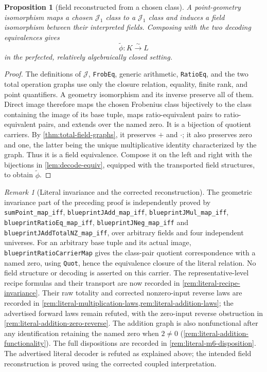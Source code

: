 \documentclass[11pt,oneside]{article}
\newtheorem{proposition}[theorem]{Proposition}
\theoremstyle{definition}
\theoremstyle{remark}
\newtheorem{remark}[theorem]{Remark}
\newcommand{\Jrel}{\mathcal{J}}
\newcommand{\lean}[1]{\nolinkurl{#1}}
\begin{document}
\begin{proposition}[field reconstructed from a chosen class]\label{prop:interpreted-reconstruction}
A point-geometry isomorphism maps a chosen $\Jrel_1$ class to a $\Jrel_1$ class and
induces a field isomorphism between their interpreted fields.  Composing with the two
decoding equivalences gives
\[
  \widetilde\phi:K\overset\sim\longrightarrow L
\]
in the perfected, relatively algebraically closed setting.
\end{proposition}
\begin{proof}
The definitions of $\Jrel$, \lean{FrobEq}, generic arithmetic, \lean{RatioEq}, and the
two total operation graphs use only the closure relation, equality, finite rank, and point
quantifiers.  A geometry isomorphism and its inverse preserve all of them.  Direct image
therefore maps the chosen Frobenius class bijectively to the class containing the image of
its base tuple, maps ratio-equivalent pairs to ratio-equivalent pairs, and extends over the
named zero.  It is a bijection of quotient carriers.  By
\cref{thm:total-field-graphs}, it preserves $+$ and $\cdot$; it also preserves zero and
one, the latter being the unique multiplicative identity characterized by the graph.
Thus it is a field equivalence.  Compose it on the left and right with the bijections in
\cref{lem:decode-equiv}, equipped with the transported field structures, to obtain
$\widetilde\phi$.
\end{proof}

\begin{remark}[Literal invariance and the corrected reconstruction]
The geometric invariance part of the preceding proof is independently proved by
\lean{sumPoint_map_iff}, \lean{blueprintJAdd_map_iff}, \lean{blueprintJMul_map_iff},
\lean{blueprintRatioEq_map_iff}, \lean{blueprintJNeg_map_iff} and
\lean{blueprintJAddTotalNZ_map_iff}, over arbitrary fields and four independent
universes. For an arbitrary base tuple and its actual image,
\lean{blueprintRatioCarrierMap} gives the class-pair quotient correspondence with
a named zero, using \lean{Quot}, hence the equivalence closure of the literal
relation. No field structure or decoding is asserted on this carrier.
The representative-level recipe formulas and their transport are now recorded in
\cref{rem:literal-recipe-invariance}. Their raw totality and corrected nonzero-input
reverse laws are recorded in \cref{rem:literal-multiplication-laws,rem:literal-addition-laws};
the advertised forward laws remain refuted, with the zero-input reverse obstruction in
\cref{rem:literal-addition-zero-reverse}. The addition graph is also nonfunctional after
any identification retaining the named zero when $2\ne0$
(\cref{rem:literal-addition-functionality}). The full dispositions are recorded in
\cref{rem:literal-m6-disposition}.
The advertised literal decoder is refuted as explained above; the intended
field reconstruction is proved using the corrected coupled interpretation.
\end{remark}
\end{document}
